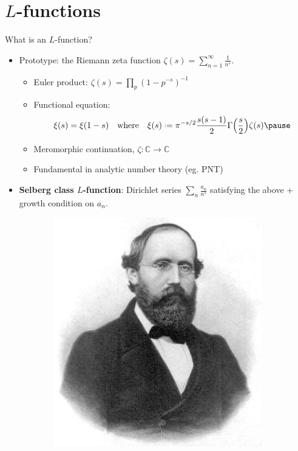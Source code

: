 \documentclass[10pt]{beamer}
\newcommand{\C}{\mathbb{C}}
\newcommand*{\defeq}{\mathrel{\vcenter{\baselineskip0.5ex \lineskiplimit0pt
      \hbox{\scriptsize.}\hbox{\scriptsize.}}}%
  =}
\begin{document}
\section{$L$-functions}
\begin{frame}{What is an $L$-function?}
\begin{itemize}[leftmargin=2pt]\pause
\item Prototype: the Riemann zeta function $\zeta(s) = \sum_{n=1}^{\infty}\frac{1}{n^{s}}$.\pause
\begin{itemize}
\item Euler product: $\zeta(s) = \prod_{p} (1-p^{-s})^{-1}$\pause
\item Functional equation:
  \[     \xi(s) = \xi(1-s) \qq{where} \xi(s) \defeq
  \pi^{-s/2}\frac{s(s-1)}{2} \Gamma\qty(\frac{s}{2})\zeta(s) \vspace{-10pt}\pause
  \]
\item Meromorphic continuation, $\zeta \colon \C \to \C$ \pause
\item Fundamental in analytic number theory (eg. PNT)  \pause
\end{itemize}
\item \textbf{Selberg class $L$-function}: Dirichlet series
  $\sum_{n}\frac{a_{n}}{n^{s}}$ satisfying the above + growth condition
  on $a_{n}$.
\end{itemize}
  \begin{figure}[H]
  \centering
  \begin{subfigure}[b]{0.3\textwidth}
  \centering
\includegraphics[width=.6\textwidth]{Riemann.jpeg}
\end{subfigure}
  \begin{subfigure}[b]{0.3\textwidth}
  \centering

\end{subfigure}
\end{figure}
\end{frame}
\end{document}
